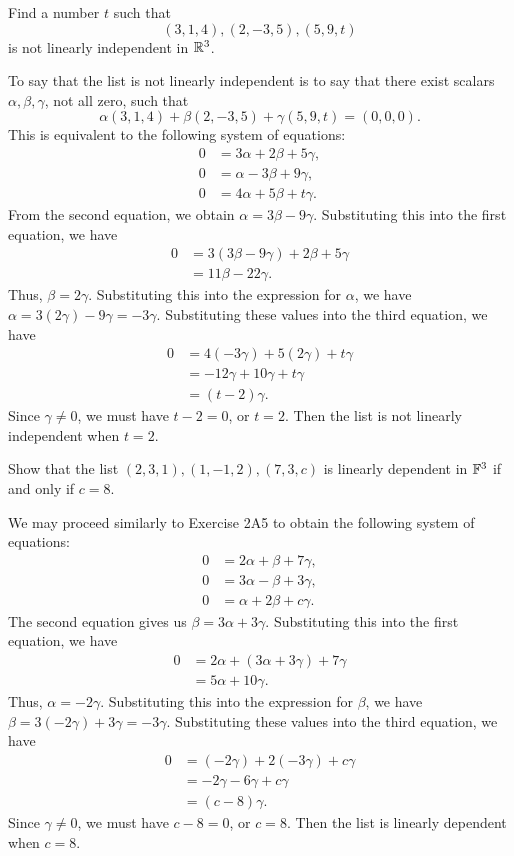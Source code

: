 \begin{exc}
\begin{exercise}
Find a number $t$ such that
\[ (3,1,4),(2,-3,5),(5,9,t) \]
is not linearly independent in $\mathbb{R}^3$.
\end{exercise}
\begin{solution}
To say that the list is not linearly independent is to say that there exist
scalars $\alpha,\beta,\gamma$, not all zero, such that
\[ \alpha(3,1,4)+\beta(2,-3,5)+\gamma(5,9,t)=(0,0,0). \]
This is equivalent to the following system of equations:
\begin{align*}
0 &= 3\alpha+2\beta+5\gamma,\\
0 &= \alpha-3\beta+9\gamma,\\
0 &= 4\alpha+5\beta+t\gamma.
\end{align*}
From the second equation, we obtain $\alpha=3\beta-9\gamma$. Substituting this
into the first equation, we have
\begin{align*}
0 &= 3(3\beta-9\gamma)+2\beta+5\gamma\\
  &= 11\beta-22\gamma.
\end{align*}
Thus, $\beta=2\gamma$. Substituting this into the expression for $\alpha$, we
have $\alpha=3(2\gamma)-9\gamma=-3\gamma$. Substituting these values into the
third equation, we have
\begin{align*}
0 &= 4(-3\gamma)+5(2\gamma)+t\gamma\\
  &= -12\gamma+10\gamma+t\gamma\\
  &= (t-2)\gamma.
\end{align*}
Since $\gamma\ne0$, we must have $t-2=0$, or $t=2$. Then the list is not
linearly independent when $t=2$.
\end{solution}

\begin{exercise}
Show that the list $(2,3,1),(1,-1,2),(7,3,c)$ is linearly dependent in $\mathbb{F}^3$
if and only if $c=8$.
\end{exercise}
\begin{solution}
We may proceed similarly to Exercise 2A5 to obtain the following system of
equations:
\begin{align*}
0 &= 2\alpha+\beta+7\gamma,\\
0 &= 3\alpha-\beta+3\gamma,\\
0 &= \alpha+2\beta+c\gamma.
\end{align*}
The second equation gives us $\beta=3\alpha+3\gamma$. Substituting this into
the first equation, we have
\begin{align*}
0 &= 2\alpha+(3\alpha+3\gamma)+7\gamma\\
  &= 5\alpha+10\gamma.
\end{align*}
Thus, $\alpha=-2\gamma$. Substituting this into the expression for $\beta$, we
have $\beta=3(-2\gamma)+3\gamma=-3\gamma$. Substituting these values into the
third equation, we have
\begin{align*}
0 &= (-2\gamma)+2(-3\gamma)+c\gamma\\
  &= -2\gamma-6\gamma+c\gamma\\
  &= (c-8)\gamma.
\end{align*}
Since $\gamma\ne0$, we must have $c-8=0$, or $c=8$. Then the list is linearly
dependent when $c=8$.


\end{solution}
\end{exc}
